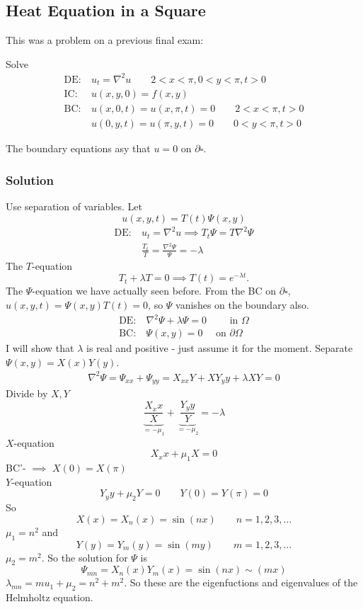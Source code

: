 \documentclass{article}
\begin{document}
\subsection{Heat Equation in a Square}
This was a problem on a previous final exam:

Solve
\begin{align*}
\text{DE:}&~ u_t = \nabla^2 u \qquad 2 < x < \pi, 0 < y < \pi, t > 0 \\
\text{IC:}&~ u(x,y,0) = f(x,y) \\
\text{BC:}&~ u(x,0,t) = u(x,\pi,t) = 0 \qquad 2 < x < \pi, t > 0 \\
&~ u(0,y,t) = u(\pi,y,t) = 0 \qquad 0 < y < \pi, t > 0
\end{align*}

The boundary equations asy that $u = 0$ on $\partial \square.$

\subsubsection{Solution}
Use separation of variables. Let
\[ u(x,y,t) = T(t) \Psi(x,y)\]
\begin{align*}
\text{DE:}&~ u_t = \nabla^2u \implies T_t \Psi = T \nabla^2 \Psi \\
        &~ \frac{T_t}{T} = \frac{\nabla^2 \Psi}{\Psi} = - \lambda
\end{align*}
The $T$-equation
\[ T_t + \lambda T = 0 \implies T(t) = e^{-\lambda t}.\]
The $\Psi$-equation we have actually seen before. From the BC on $\partial
\square$, $u(x,y,t) = \Psi(x,y) T(t) = 0$, so $\Psi$ vanishes on the boundary
also.
\begin{align*}
\text{DE:}&~ \nabla^2 \Psi + \lambda \Psi = 0 \qquad \text{ in } \Omega\\
\text{BC:}&~ \Psi(x,y) = 0 \quad \text{ on } \partial \Omega
\end{align*}
I will show that $\lambda$ is real and positive - just assume it for the moment.
Separate $\Psi(x,y) = X(x)Y(y)$.
\begin{align*}
    \nabla^2 \Psi = \Psi_{xx} + \Psi_{yy} = X_{xx} Y + XY_yy + \lambda XY = 0
\end{align*}
Divide by $X,Y$
\[\underbrace{\frac{X_xx}{X}}_{= - \mu_1} + \underbrace{\frac{Y_yy}{Y}}_{= -
    \mu_2} = - \lambda\]
$X$-equation
\[X_xx + \mu_1 X = 0\]
BC'- $\implies$ $X(0) = X(\pi)$\\
$Y$-equation
\[Y_yy + \mu_2 Y = 0 \qquad Y(0) = Y(\pi) = 0 \]
So
\[X(x) = X_n(x) = \sin(nx) \qquad n = 1, 2, 3, \ldots\]
$\mu_1 = n^2$ and
\[Y(y) = Y_m(y) = \sin(my) \qquad m = 1, 2, 3, \ldots\]
$\mu_2 = m^2$. So the solution for $\Psi$ is
\[\Psi_{mn} = X_n(x)Y_m(x) = \sin(nx)\sim(mx) \]
$\lambda_{mn} = mu_1 + \mu_2 = n^2 + m^2$. So these are the eigenfuctions and
eigenvalues of the Helmholtz equation.
\end{document}
